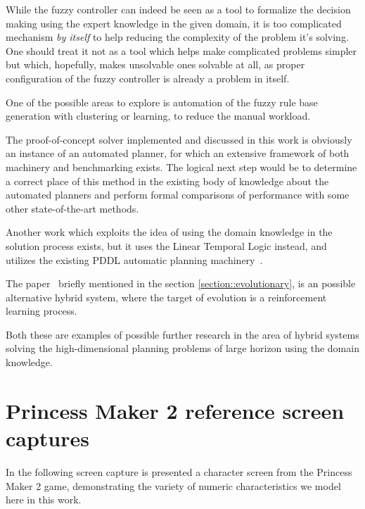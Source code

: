 \documentclass[12pt, a4paper]{report}
\begin{document}
	While the fuzzy controller can indeed be seen as a tool to formalize the decision making using the expert knowledge in the given domain, it is too complicated mechanism \textit{by itself} to help reducing the complexity of the problem it's solving.
	One should treat it not as a tool which helps make complicated problems simpler but which, hopefully, makes unsolvable ones solvable at all, as proper configuration of the fuzzy controller is already a problem in itself.
	
	One of the possible areas to explore is automation of the fuzzy rule base generation with clustering or learning, to reduce the manual workload.

	The proof-of-concept solver implemented and discussed in this work is obviously an instance of an automated planner, for which an extensive framework of both machinery and benchmarking exists.
	The logical next step would be to determine a correct place of this method in the existing body of knowledge about the automated planners and perform formal comparisons of performance with some other state-of-the-art methods.

	Another work which exploits the idea of using the domain knowledge in the solution process exists, but it uses the Linear Temporal Logic instead, and utilizes the existing PDDL automatic planning machinery~\cite{LU2025121666}.

	The paper~\cite{song2023rl_ea} briefly mentioned in the section \ref{section::evolutionary}, is an possible alternative hybrid system, where the target of evolution is a reinforcement learning process.

	Both these are examples of possible further research in the area of hybrid systems solving the high-dimensional planning problems of large horizon using the domain knowledge.
	
	\printbibliography

	\appendix
	
	\chapter{Princess Maker 2 reference screen captures}
	\label{appendix::screenshots}
	
	In the following screen capture is presented a character screen from the Princess Maker 2 game, demonstrating the variety of numeric characteristics we model here in this work.
	
\end{document}
